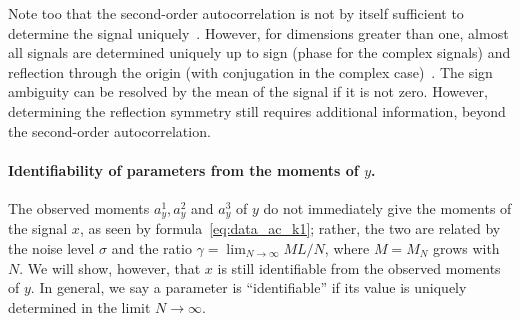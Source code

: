 \documentclass[english,11pt]{article}
\newcommand{\1}{\mathbf{1}}
\numberwithin{equation}{section}
\theoremstyle{plain}
\theoremstyle{definition}
\theoremstyle{remark}
\theoremstyle{plain}
\theoremstyle{remark}
\theoremstyle{plain}
\theoremstyle{plain}
\newcommand{\SNR}{\ensuremath{\textsf{SNR}}}
\begin{document}

Note too that the second-order autocorrelation is not by itself sufficient to determine the signal uniquely~\cite{beinert2015ambiguities,bendory2017fourier}.
However, for dimensions greater than one, almost all signals are determined uniquely up to sign (phase for the complex signals) and reflection through the origin (with conjugation in the complex case)~\cite{hayes1982reconstruction,hayes1982reducible}. The sign ambiguity can be resolved by the mean of the signal if it is not zero. However, determining the reflection symmetry still requires additional information, beyond the second-order autocorrelation.


\paragraph{Identifiability of parameters from the moments of $y$.}

The observed moments $a_y^1,a_y^2$ and $a_y^3$ of $y$ do not immediately give the moments of the signal $x$, as seen by formula~\eqref{eq:data_ac_k1}; rather, the two are related by the noise level $\sigma$ and the ratio $\gamma = \lim_{N\to\infty}ML/N$, where $M=M_N$ grows with $N$. We will show, however, that $x$ is still identifiable from the observed moments of $y$. In general, we say a parameter is ``identifiable'' if its value is uniquely determined in the limit $N \to \infty$.
\end{document}
